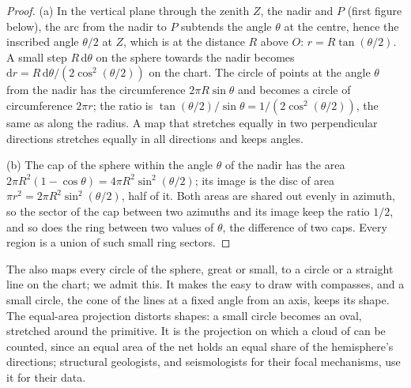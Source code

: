 \begin{proof}
(a) In the vertical plane through the zenith $Z$, the nadir and $P$
(first figure below), the arc from the nadir to $P$
subtends the angle $\theta$ at the centre, hence the inscribed angle
$\theta/2$ at $Z$, which is at the distance $R$ above $O$: $r =
R\tan(\theta/2)$. A small step $R\,\mathrm d\theta$ on the sphere towards the
nadir becomes $\mathrm dr = R\,\mathrm d\theta/(2\cos^2(\theta/2))$ on the
chart. The circle of points at the angle $\theta$ from the nadir has the
circumference $2\pi R\sin\theta$ and becomes a circle of circumference $2\pi
r$; the ratio is $\tan(\theta/2)/\sin\theta = 1/(2\cos^2(\theta/2))$, the same
as along the radius. A map that stretches equally in two perpendicular
directions stretches equally in all directions and keeps angles.

(b) The cap of the sphere within the angle $\theta$ of the nadir has the area
$2\pi R^2(1 - \cos\theta) = 4\pi R^2\sin^2(\theta/2)$; its image is the disc
of area $\pi r^2 = 2\pi R^2\sin^2(\theta/2)$, half of it. Both areas are
shared out evenly in azimuth, so the sector of the cap between two azimuths
and its image keep the ratio $1/2$, and so does the ring between two values
of $\theta$, the difference of two caps. Every region is a union of such
small ring sectors.
\end{proof}

The  also maps every circle of the sphere, great or
small, to a circle or a straight line on the chart; we admit this. It makes the
 easy to draw with compasses, and a small circle, the cone of
the lines at a fixed angle from an axis, keeps its shape. The equal-area
projection distorts shapes: a small circle becomes an oval, stretched
around the primitive. It is the projection on which a cloud of  can be
counted, since an equal area of the net holds an equal share of the
hemisphere's directions; structural geologists, and seismologists for their
focal mechanisms, use it for their data.

